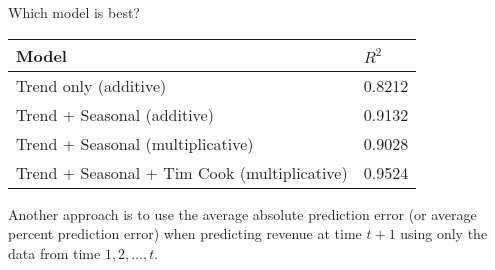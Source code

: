 \documentclass{beamer}\usepackage[]{graphicx}\usepackage[]{color}
\begin{document}
\begin{darkframes}
\begin{frame}{Which model is best?}
      \begin{center}
        \begin{tabular}{ll}
          \hline
          Model & $R^2$ \\
          \hline
          Trend only (additive) & 0.8212 \\
          Trend + Seasonal (additive) & 0.9132 \\
          Trend + Seasonal (multiplicative) & 0.9028 \\
          Trend + Seasonal + Tim Cook (multiplicative) & 0.9524 \\
          \hline
        \end{tabular}
      \end{center}

      \pause

      Another approach is to use the average absolute prediction error (or average percent prediction error) when predicting revenue at time $t+1$ using only the data from time $1,2,\ldots, t$.
    \end{frame}
  \end{darkframes}
\end{document}

